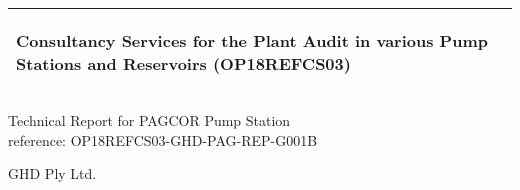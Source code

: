 %
\begin{titlepage}
  \addtolength{\hoffset}{0.5\evensidemargin-0.5\oddsidemargin} %
  \noindent%
  \begin{tabular}{@{}p{\textwidth}@{}}
    \toprule[2pt]
    \midrule
    \vspace{0.2cm}
    \begin{center}
    \Huge{\textbf{
      Consultancy Services for the Plant Audit in various Pump Stations and Reservoirs (OP18REFCS03) %
    }}
    \end{center}
    \begin{center}
      \Large{
      }
    \end{center}
    \vspace{0.2cm}\\
    \midrule
    \toprule[2pt]
  \end{tabular}
  \vspace{4 cm}
  \begin{center}
    {\large
      Technical Report for PAGCOR Pump Station%
    }\\
    \vspace{0.2cm}
    {\Large
      reference: OP18REFCS03-GHD-PAG-REP-G001B%
    }
  \end{center}
  \vfill
  \begin{center}
  GHD Ply Ltd.\\
  \end{center}
\end{titlepage}
\clearpage